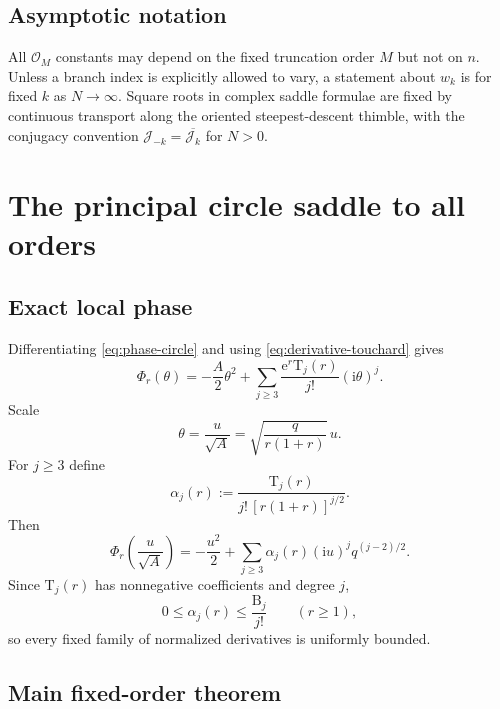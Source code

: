 \documentclass[11pt,a4paper]{article}
\theoremstyle{definition}
\newcommand{\Bell}{\mathrm B}
\newcommand{\Touch}{\mathrm T}
\newcommand{\ee}{\mathrm e}
\newcommand{\ii}{\mathrm i}
\newcommand{\cJ}{\mathcal J}
\newcommand{\bigO}{\mathcal O}
\begin{document}
\subsection{Asymptotic notation}

All $\bigO_M$ constants may depend on the fixed truncation order $M$ but not on
$n$.  Unless a branch index is explicitly allowed to vary, a statement about
$w_k$ is for fixed $k$ as $N\to\infty$.  Square roots in complex saddle
formulae are fixed by continuous transport along the oriented
steepest-descent thimble, with the conjugacy convention
$\cJ_{-k}=\overline{\cJ_k}$ for $N>0$.

\section{The principal circle saddle to all orders}

\subsection{Exact local phase}

Differentiating \eqref{eq:phase-circle} and using
\eqref{eq:derivative-touchard} gives
\begin{equation}\label{eq:phase-taylor}
 \Phi_r(\theta)
 =-\frac A2\theta^2+
 \sum_{j\ge3}\frac{\ee^r\Touch_j(r)}{j!}(\ii\theta)^j.
\end{equation}
Scale
\begin{equation}\label{eq:scale-u}
 \theta=\frac{u}{\sqrt A}
 =\sqrt{\frac{q}{r(1+r)}}\,u.
\end{equation}
For $j\ge3$ define
\begin{equation}\label{eq:alpha}
 \alpha_j(r):=
 \frac{\Touch_j(r)}{j!\,[r(1+r)]^{j/2}}.
\end{equation}
Then
\begin{equation}\label{eq:scaled-phase}
 \Phi_r\!\left(\frac{u}{\sqrt A}\right)
 =-\frac{u^2}{2}
 +\sum_{j\ge3}\alpha_j(r)(\ii u)^j q^{(j-2)/2}.
\end{equation}
Since $\Touch_j(r)$ has nonnegative coefficients and degree $j$,
\begin{equation}\label{eq:alpha-bound}
 0\le \alpha_j(r)\le\frac{\Bell_j}{j!}
 \qquad (r\ge1),
\end{equation}
so every fixed family of normalized derivatives is uniformly bounded.

\subsection{Main fixed-order theorem}
\end{document}
